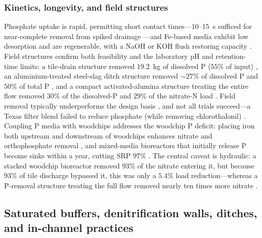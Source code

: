 \subsubsection{Kinetics, longevity, and field structures}

Phosphate uptake is rapid, permitting short contact times---$10$--$15$~s
sufficed for near-complete removal from spiked drainage
\parencite{Allred2017}---and Fe-based media exhibit low desorption and are
regenerable, with a NaOH or KOH flush restoring capacity
\parencite{Allred2014,Allred2017,Kumari2025,Sellner2019b}. Field structures
confirm both feasibility and the laboratory pH and retention-time limits: a
tile-drain structure removed $19.2$~kg of dissolved P ($55\%$ of input)
\parencite{Penn2020}, an aluminium-treated steel-slag ditch structure removed
$\sim27\%$ of dissolved P and $50\%$ of total P \parencite{Shedekar2020}, and
a compact activated-alumina structure treating the entire flow removed $30\%$
of the dissolved-P and $29\%$ of the nitrate-N load
\parencite{Penn2024}. Field removal typically underperforms the design basis
\parencite{Shedekar2020}, and not all trials succeed---a Texas filter blend
failed to reduce phosphate (while removing chlorothalonil)
\parencite{Agrawal2011b}. Coupling P media with woodchips addresses the
woodchip P deficit: placing iron both upstream and downstream of woodchips
enhances nitrate and orthophosphate removal
\parencite{Goodwin2015,Hua2016,Li2018b,Oladeji2023}, and mixed-media
bioreactors that initially release P become sinks within a year, cutting SRP
$97\%$ \parencite{Husk2018,Zhang2024b}. The central caveat is hydraulic: a
stacked woodchip bioreactor removed $93\%$ of the nitrate entering it, but
because $93\%$ of tile discharge bypassed it, this was only a $5.4\%$ load
reduction---whereas a P-removal structure treating the full flow removed
nearly ten times more nitrate \parencite{Penn2024}.

\subsection{Saturated buffers, denitrification walls, ditches, and in-channel practices}

